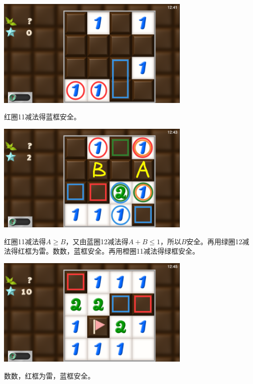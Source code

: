\subsection{} %
\begin{center}
    \includegraphics[width=0.7\textwidth]{puzzle/87-1.png}
\end{center}
红圈11减法得蓝框安全。
\begin{center}
    \includegraphics[width=0.7\textwidth]{puzzle/87-2.png}
\end{center}
红圈11减法得$A\ge B$，又由蓝圈12减法得$A+B\le 1$，所以$B$安全。再用绿圈12减法得红框为雷。数数，蓝框安全。再用橙圈11减法得绿框安全。
\begin{center}
    \includegraphics[width=0.7\textwidth]{puzzle/87-3.png}
\end{center}
数数，红框为雷，蓝框安全。

